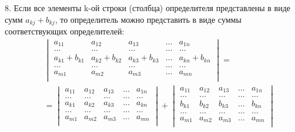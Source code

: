 \documentclass[12pt, fleqn]{extarticle}
\begin{document}
8. Если все элементы k-ой строки (столбца) определителя представлены в виде сумм \(a_{kj} + b_{kj}\), то определитель можно представить в виде суммы соответствующих определителей:
\begin{align*}
     &  &
    \begin{vmatrix}
        a_{11}          & a_{12}          & a_{13}          & \dots & a_{1n}          \\
        \dots           & \dots           & \dots           & \dots & \dots           \\
        a_{k1} + b_{k1} & a_{k2} + b_{k2} & a_{k3} + b_{k3} & \dots & a_{kn} + b_{kn} \\
        \dots           & \dots           & \dots           & \dots & \dots           \\
        a_{m1}          & a_{m2}          & a_{m3}          & \dots & a_{mn}          \\
    \end{vmatrix}
    =
    \\
     &  &
    =
    \begin{vmatrix}
        a_{11} & a_{12} & a_{13} & \dots & a_{1n} \\
        \dots  & \dots  & \dots  & \dots & \dots  \\
        a_{k1} & a_{k2} & a_{k3} & \dots & a_{kn} \\
        \dots  & \dots  & \dots  & \dots & \dots  \\
        a_{m1} & a_{m2} & a_{m3} & \dots & a_{mn} \\
    \end{vmatrix}
    +
    \begin{vmatrix}
        a_{11} & a_{12} & a_{13} & \dots & a_{1n} \\
        \dots  & \dots  & \dots  & \dots & \dots  \\
        b_{k1} & b_{k2} & b_{k3} & \dots & b_{kn} \\
        \dots  & \dots  & \dots  & \dots & \dots  \\
        a_{m1} & a_{m2} & a_{m3} & \dots & a_{mn} \\
    \end{vmatrix}
\end{align*}
\end{document}
